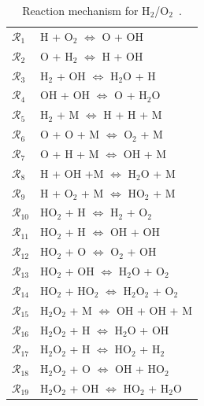 \begin{table}[htbp]
\renewcommand*{\arraystretch}{1.2}
\begin{center}
\begin{tabular}{ll}
\toprule
$\mathcal{R}_1$ & H + O$_2$ $\Longleftrightarrow$ O + OH \\
$\mathcal{R}_2$ & O + H$_2$ $\Longleftrightarrow$ H + OH \\
$\mathcal{R}_3$ & H$_2$ + OH $\Longleftrightarrow$ H$_2$O + H \\
$\mathcal{R}_4$ & OH + OH $\Longleftrightarrow$ O + H$_2$O \\
$\mathcal{R}_5$ & H$_2$ + M $\Longleftrightarrow$ H + H + M \\
$\mathcal{R}_6$ & O + O + M $\Longleftrightarrow$ O$_2$ + M \\
$\mathcal{R}_7$ & O + H + M $\Longleftrightarrow$ OH + M \\
$\mathcal{R}_8$ & H + OH +M $\Longleftrightarrow$ H$_2$O + M \\
$\mathcal{R}_9$ & H + O$_2$ + M $\Longleftrightarrow$ HO$_2$ + M \\
$\mathcal{R}_{10}$ & HO$_2$ + H $\Longleftrightarrow$ H$_2$ + O$_2$ \\
$\mathcal{R}_{11}$ & HO$_2$ + H $\Longleftrightarrow$ OH + OH \\
$\mathcal{R}_{12}$ & HO$_2$ + O $\Longleftrightarrow$ O$_2$ + OH \\
$\mathcal{R}_{13}$ & HO$_2$ + OH $\Longleftrightarrow$ H$_2$O + O$_2$ \\
$\mathcal{R}_{14}$ & HO$_2$ + HO$_2$ $\Longleftrightarrow$ H$_2$O$_2$ + O$_2$ \\
$\mathcal{R}_{15}$ & H$_2$O$_2$ + M $\Longleftrightarrow$ OH + OH + M \\
$\mathcal{R}_{16}$ & H$_2$O$_2$ + H $\Longleftrightarrow$ H$_2$O + OH \\
$\mathcal{R}_{17}$ & H$_2$O$_2$ + H $\Longleftrightarrow$ HO$_2$ + H$_2$ \\
$\mathcal{R}_{18}$ & H$_2$O$_2$ + O $\Longleftrightarrow$ OH + HO$_2$ \\
$\mathcal{R}_{19}$ & H$_2$O$_2$ + OH $\Longleftrightarrow$ HO$_2$ + H$_2$O \\
\bottomrule
\end{tabular}
\end{center}

\caption{Reaction mechanism for H$_2$/O$_2$~\cite{Yetter:1991}.}
\label{tab:kinetics}
\end{table}

